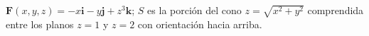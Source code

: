 \item $\mathbf{F}(x,y,z) = -x\mathbf{i} - y\mathbf{j} + z^3\mathbf{k}$; $S$ es la porción del cono $z = \sqrt{x^2 + y^2}$ comprendida entre los planos $z = 1$ y $z = 2$ con orientación hacia arriba.

